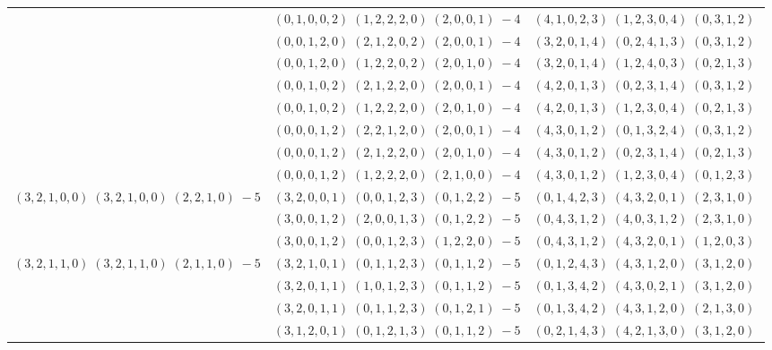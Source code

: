 \documentclass[11pt]{article}
\begin{document}
\begin{longtable}[l]{|c|c|c|}
 \cline{2-3} 
 & $(0 ,1 ,0 ,0 ,2) \;(1 ,2 ,2 ,2 ,0) \;(2 ,0 ,0 ,1) \;-4$ & $(4 ,1 ,0 ,2 ,3) \;(1 ,2 ,3 ,0 ,4) \;(0 ,3 ,1 ,2) \;$\\ 
 \cline{2-3} 
 & $(0 ,0 ,1 ,2 ,0) \;(2 ,1 ,2 ,0 ,2) \;(2 ,0 ,0 ,1) \;-4$ & $(3 ,2 ,0 ,1 ,4) \;(0 ,2 ,4 ,1 ,3) \;(0 ,3 ,1 ,2) \;$\\ 
 \cline{2-3} 
 & $(0 ,0 ,1 ,2 ,0) \;(1 ,2 ,2 ,0 ,2) \;(2 ,0 ,1 ,0) \;-4$ & $(3 ,2 ,0 ,1 ,4) \;(1 ,2 ,4 ,0 ,3) \;(0 ,2 ,1 ,3) \;$\\ 
 \cline{2-3} 
 & $(0 ,0 ,1 ,0 ,2) \;(2 ,1 ,2 ,2 ,0) \;(2 ,0 ,0 ,1) \;-4$ & $(4 ,2 ,0 ,1 ,3) \;(0 ,2 ,3 ,1 ,4) \;(0 ,3 ,1 ,2) \;$\\ 
 \cline{2-3} 
 & $(0 ,0 ,1 ,0 ,2) \;(1 ,2 ,2 ,2 ,0) \;(2 ,0 ,1 ,0) \;-4$ & $(4 ,2 ,0 ,1 ,3) \;(1 ,2 ,3 ,0 ,4) \;(0 ,2 ,1 ,3) \;$\\ 
 \cline{2-3} 
 & $(0 ,0 ,0 ,1 ,2) \;(2 ,2 ,1 ,2 ,0) \;(2 ,0 ,0 ,1) \;-4$ & $(4 ,3 ,0 ,1 ,2) \;(0 ,1 ,3 ,2 ,4) \;(0 ,3 ,1 ,2) \;$\\ 
 \cline{2-3} 
 & $(0 ,0 ,0 ,1 ,2) \;(2 ,1 ,2 ,2 ,0) \;(2 ,0 ,1 ,0) \;-4$ & $(4 ,3 ,0 ,1 ,2) \;(0 ,2 ,3 ,1 ,4) \;(0 ,2 ,1 ,3) \;$\\ 
 \cline{2-3} 
 & $(0 ,0 ,0 ,1 ,2) \;(1 ,2 ,2 ,2 ,0) \;(2 ,1 ,0 ,0) \;-4$ & $(4 ,3 ,0 ,1 ,2) \;(1 ,2 ,3 ,0 ,4) \;(0 ,1 ,2 ,3) \;$\\ \hline\multirow[t]{3}{*}{ $(3 ,2 ,1 ,0 ,0) \;(3 ,2 ,1 ,0 ,0) \;(2 ,2 ,1 ,0) \;-5$ }  & $(3 ,2 ,0 ,0 ,1) \;(0 ,0 ,1 ,2 ,3) \;(0 ,1 ,2 ,2) \;-5$ & $(0 ,1 ,4 ,2 ,3) \;(4 ,3 ,2 ,0 ,1) \;(2 ,3 ,1 ,0) \;$\\ 
 \cline{2-3} 
 & $(3 ,0 ,0 ,1 ,2) \;(2 ,0 ,0 ,1 ,3) \;(0 ,1 ,2 ,2) \;-5$ & $(0 ,4 ,3 ,1 ,2) \;(4 ,0 ,3 ,1 ,2) \;(2 ,3 ,1 ,0) \;$\\ 
 \cline{2-3} 
 & $(3 ,0 ,0 ,1 ,2) \;(0 ,0 ,1 ,2 ,3) \;(1 ,2 ,2 ,0) \;-5$ & $(0 ,4 ,3 ,1 ,2) \;(4 ,3 ,2 ,0 ,1) \;(1 ,2 ,0 ,3) \;$\\ \hline\multirow[t]{15}{*}{ $(3 ,2 ,1 ,1 ,0) \;(3 ,2 ,1 ,1 ,0) \;(2 ,1 ,1 ,0) \;-5$ }  & $(3 ,2 ,1 ,0 ,1) \;(0 ,1 ,1 ,2 ,3) \;(0 ,1 ,1 ,2) \;-5$ & $(0 ,1 ,2 ,4 ,3) \;(4 ,3 ,1 ,2 ,0) \;(3 ,1 ,2 ,0) \;$\\ 
 \cline{2-3} 
 & $(3 ,2 ,0 ,1 ,1) \;(1 ,0 ,1 ,2 ,3) \;(0 ,1 ,1 ,2) \;-5$ & $(0 ,1 ,3 ,4 ,2) \;(4 ,3 ,0 ,2 ,1) \;(3 ,1 ,2 ,0) \;$\\ 
 \cline{2-3} 
 & $(3 ,2 ,0 ,1 ,1) \;(0 ,1 ,1 ,2 ,3) \;(0 ,1 ,2 ,1) \;-5$ & $(0 ,1 ,3 ,4 ,2) \;(4 ,3 ,1 ,2 ,0) \;(2 ,1 ,3 ,0) \;$\\ 
 \cline{2-3} 
 & $(3 ,1 ,2 ,0 ,1) \;(0 ,1 ,2 ,1 ,3) \;(0 ,1 ,1 ,2) \;-5$ & $(0 ,2 ,1 ,4 ,3) \;(4 ,2 ,1 ,3 ,0) \;(3 ,1 ,2 ,0) \;$\\ 

\end{longtable}
\end{document}
